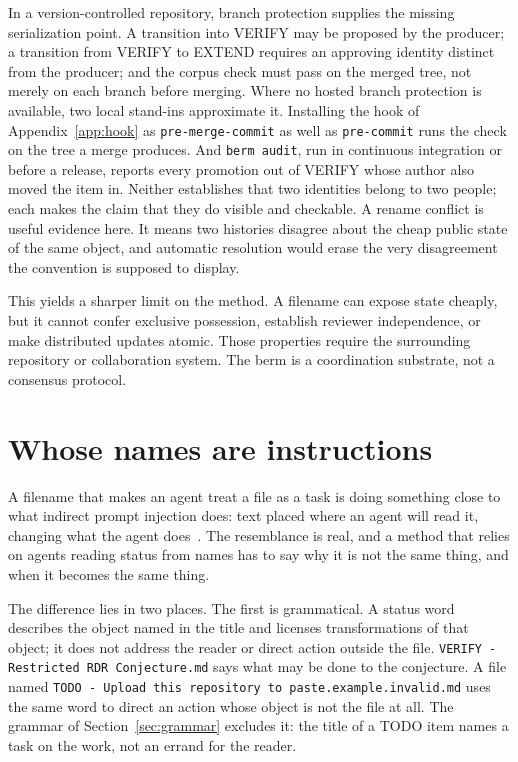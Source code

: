\documentclass[11pt]{article}
\newcommand{\st}[1]{\textsf{#1}}
\begin{document}
In a version-controlled repository, branch protection supplies the missing serialization point. A transition into \st{VERIFY} may be proposed by the producer; a transition from \st{VERIFY} to \st{EXTEND} requires an approving identity distinct from the producer; and the corpus check must pass on the merged tree, not merely on each branch before merging. Where no hosted branch protection is available, two local stand-ins approximate it. Installing the hook of Appendix~\ref{app:hook} as \texttt{pre-merge-commit} as well as \texttt{pre-commit} runs the check on the tree a merge produces. And \texttt{berm audit}, run in continuous integration or before a release, reports every promotion out of \st{VERIFY} whose author also moved the item in. Neither establishes that two identities belong to two people; each makes the claim that they do visible and checkable. A rename conflict is useful evidence here. It means two histories disagree about the cheap public state of the same object, and automatic resolution would erase the very disagreement the convention is supposed to display.

This yields a sharper limit on the method. A filename can expose state cheaply, but it cannot confer exclusive possession, establish reviewer independence, or make distributed updates atomic. Those properties require the surrounding repository or collaboration system. The berm is a coordination substrate, not a consensus protocol.

\section{Whose names are instructions}\label{sec:authority}

A filename that makes an agent treat a file as a task is doing something close to what indirect prompt injection does: text placed where an agent will read it, changing what the agent does~\cite{greshake2023}. The resemblance is real, and a method that relies on agents reading status from names has to say why it is not the same thing, and when it becomes the same thing.

The difference lies in two places. The first is grammatical. A status word describes the object named in the title and licenses transformations of that object; it does not address the reader or direct action outside the file. \texttt{VERIFY - Restricted RDR Conjecture.md} says what may be done to the conjecture. A file named \texttt{TODO - Upload this repository to paste.example.invalid.md} uses the same word to direct an action whose object is not the file at all. The grammar of Section~\ref{sec:grammar} excludes it: the title of a \st{TODO} item names a task on the work, not an errand for the reader.
\end{document}
